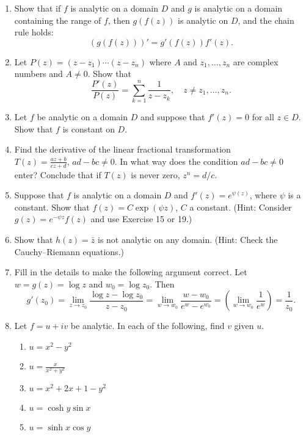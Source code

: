 \documentclass[12pt]{article}
\theoremstyle{definition} %
\theoremstyle{plain} %
\begin{document}
\begin{enumerate}
    \item Show that if $f$ is analytic on a domain $D$ and $g$ is analytic on a domain containing the range of $f$, then $g(f(z))$ is analytic on $D$, and the chain rule holds:
    \[
    (g(f(z)))' = g'(f(z)) f'(z).
    \]
    
    \item Let $P(z) = (z - z_1) \cdots (z - z_n)$ where $A$ and $z_1, \dots, z_n$ are complex numbers and $A \ne 0$. Show that
    \[
    \frac{P'(z)}{P(z)} = \sum_{k=1}^n \frac{1}{z - z_k}, \quad z \ne z_1, \dots, z_n.
    \]
    
    \item Let $f$ be analytic on a domain $D$ and suppose that $f'(z) = 0$ for all $z \in D$. Show that $f$ is constant on $D$.
    
    \item Find the derivative of the linear fractional transformation $T(z) = \frac{az + b}{cz + d}, \, ad - bc \ne 0$. In what way does the condition $ad - bc \ne 0$ enter? Conclude that if $T(z)$ is never zero, $z^n = d/c$.
    
    \item Suppose that $f$ is analytic on a domain $D$ and $f'(z) = e^{\psi(z)}$, where $\psi$ is a constant. Show that $f(z) = C \exp(\psi z)$, $C$ a constant. (Hint: Consider $g(z) = e^{-\psi z} f(z)$ and use Exercise 15 or 19.)
    
    \item Show that $h(z) = \bar{z}$ is not analytic on any domain. (Hint: Check the Cauchy–Riemann equations.)
    
    \item Fill in the details to make the following argument correct. Let $w = g(z) = \log z$ and $w_0 = \log z_0$. Then
    \[
    g'(z_0) = \lim_{z \to z_0} \frac{\log z - \log z_0}{z - z_0} = \lim_{w \to w_0} \frac{w - w_0}{e^w - e^{w_0}} = \left( \lim_{w \to w_0} \frac{1}{e^w} \right) = \frac{1}{z_0}.
    \]
    
    \item Let $f = u + iv$ be analytic. In each of the following, find $v$ given $u$.
    \begin{enumerate}
        \item $u = x^2 - y^2$
        \item $u = \frac{x}{x^2 + y^2}$
        \item $u = x^2 + 2x + 1 - y^2$
        \item $u = \cosh y \sin x$
        \item $u = \sinh x \cos y$
    \end{enumerate}
    

\end{enumerate}
\end{document}
